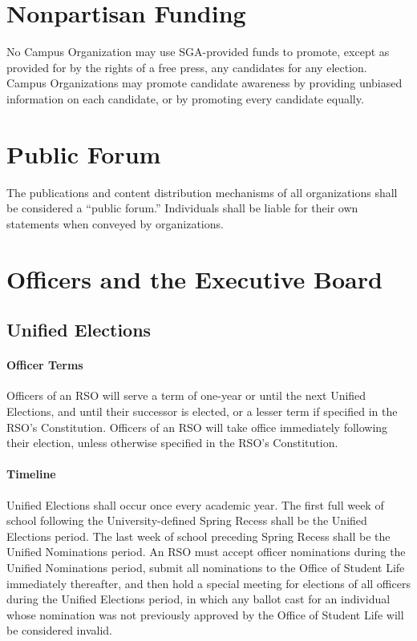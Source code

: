 \documentclass[12pt]{scrreprt}
\begin{document}
\section{Nonpartisan Funding}
No Campus Organization may use SGA-provided funds to promote, except as 
provided for by the rights of a free press, any candidates for any election. 
Campus Organizations may promote candidate awareness by providing unbiased 
information on each candidate, or by promoting every candidate equally.

\section{Public Forum}
The publications and content distribution mechanisms of all organizations 
shall be considered a ``public forum.'' Individuals shall be liable for their 
own statements when conveyed by organizations.

\section{Officers and the Executive Board}

\subsection{Unified Elections}

\paragraph{Officer Terms}
Officers of an RSO will serve a term of one-year or until the next
Unified Elections, and until their successor is elected, or a lesser
term if specified in the RSO’s Constitution. Officers of an RSO will
take office immediately following their election, unless otherwise
specified in the RSO’s Constitution.

\paragraph{Timeline}
Unified Elections shall occur once every academic year. The first full
week of school following the University-defined Spring Recess shall be
the Unified Elections period. The last week of school preceding Spring
Recess shall be the Unified Nominations period. An RSO must accept
officer nominations during the Unified Nominations period, submit all
nominations to the Office of Student Life immediately thereafter, and
then hold a special meeting for elections of all officers during the
Unified Elections period, in which any ballot cast for an individual
whose nomination was not previously approved by the Office of Student
Life will be considered invalid.
\end{document}
